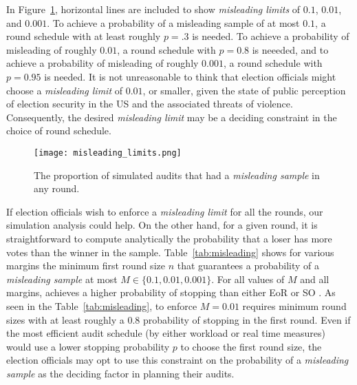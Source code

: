 In Figure~\ref{fig:misleading}, horizontal lines are included to show \emph{misleading limits} of $0.1$, $0.01$, and $0.001$.
To achieve a probability of a misleading sample of at most $0.1$, a round schedule with at least roughly $p=.3$ is needed.
To achieve a probability of misleading of roughly $0.01$, a round schedule with $p=0.8$ is neeeded, and to achieve a probability of misleading of roughly $0.001$, a round schedule with $p=0.95$ is needed.
It is not unreasonable to think that election officials might choose a \emph{misleading limit} of $0.01$, or smaller, given the state of public perception of election security in the US and the associated threats of violence.
Consequently, the desired \emph{misleading limit} may be a deciding constraint in the choice of round schedule. 

\begin{figure}
\texttt{[image: misleading\_limits.png]}
\caption{The proportion of simulated \Providence audits that had a \emph{misleading sample} in any round.}
\label{fig:misleading}
\end{figure}

If election officials wish to enforce a \emph{misleading limit} for all the rounds, our simulation analysis could help. On the other hand, for a given round, it is straightforward to compute analytically the probability that a loser has more votes than the winner in the sample. Table~\ref{tab:misleading} shows for various margins the minimum first round size $n$ that guarantees a probability of a \emph{misleading sample} at most $M\in\{0.1,0.01,0.001\}$. For all values of $M$ and all margins, \Providence achieves a higher probability of stopping than either EoR \BRAVO or SO \BRAVO. 
    As seen in the Table~\ref{tab:misleading}, to enforce $M=0.01$ requires minimum round sizes with at least roughly a $0.8$ probability of stopping in the first round. Even if the most efficient audit schedule (by either workload or real time measures) would use a lower stopping probability $p$ to choose the first round size, the election officials may opt to use this constraint on the probability of a \emph{misleading sample} as the deciding factor in planning their audits.

